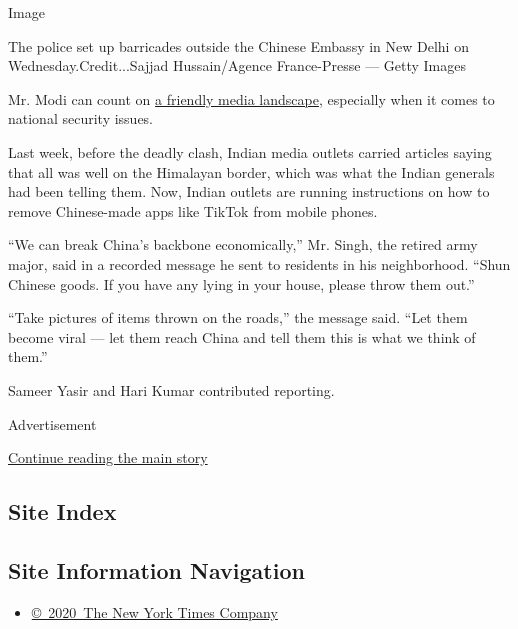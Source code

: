 Image

The police set up barricades outside the Chinese Embassy in New Delhi on
Wednesday.Credit...Sajjad Hussain/Agence France-Presse --- Getty Images

Mr. Modi can count on
\href{https://www.nytimes.com/2020/04/02/world/asia/modi-india-press-media.html}{a
friendly media landscape}, especially when it comes to national security
issues.

Last week, before the deadly clash, Indian media outlets carried
articles saying that all was well on the Himalayan border, which was
what the Indian generals had been telling them. Now, Indian outlets are
running instructions on how to remove Chinese-made apps like TikTok from
mobile phones.

``We can break China's backbone economically,'' Mr. Singh, the retired
army major, said in a recorded message he sent to residents in his
neighborhood. ``Shun Chinese goods. If you have any lying in your house,
please throw them out.''

``Take pictures of items thrown on the roads,'' the message said. ``Let
them become viral --- let them reach China and tell them this is what we
think of them.''

Sameer Yasir and Hari Kumar contributed reporting.

Advertisement

\protect\hyperlink{after-bottom}{Continue reading the main story}

\hypertarget{site-index}{%
\subsection{Site Index}\label{site-index}}

\hypertarget{site-information-navigation}{%
\subsection{Site Information
Navigation}\label{site-information-navigation}}

\begin{itemize}
\tightlist
\item
  \href{https://help.nytimes.com/hc/en-us/articles/115014792127-Copyright-notice}{©~2020~The
  New York Times Company}
\end{itemize}

